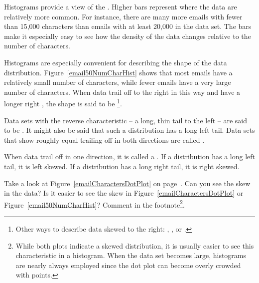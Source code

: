 Histograms provide a view of the . Higher bars represent where the data are relatively more common. For instance, there are many more emails with fewer than 15,000 characters than emails with at least 20,000 in the data set. The bars make it especially easy to see how the density of the data changes relative to the number of characters. %

Histograms are especially convenient for describing the shape of the data distribution\label{shapeFirstDiscussed}. Figure~\ref{email50NumCharHist} shows that most emails have a relatively small number of characters, while fewer emails have a very large number of characters. When data trail off to the right in this way and have a longer right ,  the shape is said to be \footnote{Other ways to describe data skewed to the right: , , or .}.

Data sets with the reverse characteristic -- a long, thin tail to the left -- are said to be . It might also be said that such a distribution has a long left tail. Data sets that show roughly equal trailing off in both directions are called . 

\begin{termBox}{
When data trail off in one direction, it is called a .  If a distribution has a long left tail, it is left skewed. If a distribution has a long right tail, it is right skewed.}
\end{termBox}

\begin{exercise}
Take a look at Figure~\ref{emailCharactersDotPlot} on page~\pageref{emailCharactersDotPlot}. Can you see the skew in the data? Is it easier to see the skew in Figure~\ref{emailCharactersDotPlot} or Figure~\ref{email50NumCharHist}? Comment in the footnote\footnote{While both plots indicate a skewed distribution, it is usually easier to see this characteristic in a histogram. When the data set becomes large, histograms are nearly always employed since the dot plot can become overly crowded with points.}.
\end{exercise}

